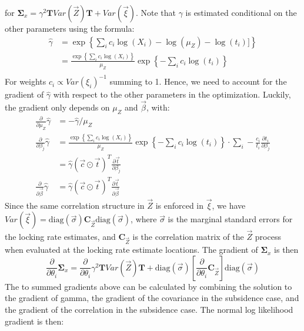 {for $\mathbf{\Sigma}_x = \gamma^2 \mathbf{T} Var\left(\vec{Z}\right) \mathbf{T} + Var(\vec{\xi})$.  Note that $\gamma$ is estimated conditional on the other parameters using the formula:
\begin{align*}
\hat{\gamma} &= \exp \left\{ \sum_i c_i \log(X_i) - \log(\mu_Z) - \log(t_i)]\right\} \\
&= \frac{\exp \left\{ \sum_i c_i \log(X_i) \right\}}{\mu_Z} \exp \left\{- \sum_i c_i \log(t_i) \right\} \\
\end{align*}
For weights $c_i \propto Var(\xi_i)^{-1}$ summing to 1. Hence, we need to account for the gradient of $\hat{\gamma}$ with respect to the other parameters in the optimization.  Luckily, the gradient only depends on $\mu_Z$ and $\vec{\beta}$, with:
\begin{align*}
\frac{\partial}{\partial \mu_Z} \hat{\gamma} &= - \hat{\gamma}/\mu_Z \\
\frac{\partial}{\partial \beta_j} \hat{\gamma} &= \frac{\exp \left\{ \sum_i c_i \log(X_i) \right\}}{\mu_Z} \exp \left\{- \sum_i c_i \log(t_i) \right\} \cdot \sum_i-\frac{c_i}{t_i} \frac{\partial t_i}{\partial \beta_j} \\
&= \hat{\gamma} (\vec{c} \odot \vec{t})^T \frac{\partial \vec{t}}{\partial \beta_j} \\
\frac{\partial}{\partial \vec{\beta}} \hat{\gamma} &= \hat{\gamma} (\vec{c} \odot \vec{t})^T \frac{\partial \vec{t}}{\partial \vec{\beta}}
\end{align*}
Since the same correlation structure in $\vec{Z}$ is enforced in $\vec{\xi }$, we have $Var(\vec{\xi }) = \text{diag}(\vec{\sigma }) \mathbf{C}_{\vec{Z}} \text{diag}(\vec{\sigma }) $, where $\vec{\sigma }$ is the marginal standard errors for the locking rate estimates, and $\mathbf{C}_{\vec{Z}}$ is the correlation matrix of the $\vec{Z}$ process when evaluated at the locking rate estimate locations. The gradient of $\mathbf{\Sigma}_x$ is then
$$ \frac{\partial}{\partial \theta_i} \mathbf{\Sigma}_x = \frac{\partial}{\partial \theta_i} \gamma^2 \mathbf{T} Var\left(\vec{Z}\right) \mathbf{T} + \text{diag}(\vec{\sigma })\left  [\frac{\partial}{\partial \theta_i} \mathbf{C}_{\vec{Z}}\right ] \text{diag}(\vec{\sigma }) $$
The to summed gradients above can be calculated by combining the solution to the gradient of gamma, the gradient of the covariance in the subsidence case, and the gradient of the correlation in the subsidence case. The normal log likelihood gradient is then:
\begin{align*}

\end{align*}}
